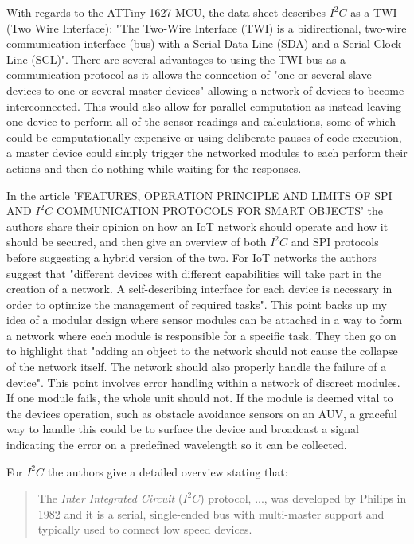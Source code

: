 \documentclass[11pt,a4paper,titlepage]{report}
\begin{document}
	With regards to the ATTiny 1627 MCU, the data sheet describes $I^{2}C$ as a TWI (Two Wire Interface): "The Two-Wire Interface (TWI) is a bidirectional, two-wire communication interface (bus) with a Serial Data Line (SDA) and a Serial Clock Line (SCL)"\cite{ATTINY1627}. There are several advantages to using the TWI bus as a communication protocol as it allows the connection of "one or several slave devices to one or several master devices"\cite{ATTINY1627} allowing a network of devices to become interconnected. This would also allow for parallel computation as instead leaving one device to perform all of the sensor readings and calculations, some of which could be computationally expensive or using deliberate pauses of code execution, a master device could simply trigger the networked modules to each perform their actions and then do nothing while waiting for the responses. 
	
	In the article 'FEATURES, OPERATION PRINCIPLE AND LIMITS OF SPI AND $I^{2}C$ COMMUNICATION PROTOCOLS FOR SMART OBJECTS' the authors share their opinion on how an IoT network should operate and how it should be secured, and then give an overview of both $I^{2}C$ and SPI protocols before suggesting a hybrid version of the two. For IoT networks the authors suggest that "different devices with different capabilities will take part in the creation of a network. A self-describing interface for each device is necessary in order to optimize the management of required tasks"\cite{I2C}. This point backs up my idea of a modular design where sensor modules can be attached in a way to form a network where each module is responsible for a specific task. They then go on to highlight that "adding an object to the network should not cause the collapse of the network itself. The network should also properly handle the failure of a device"\cite{I2C}. This point involves error handling within a network of discreet modules. If one module fails, the whole unit should not. If the module is deemed vital to the devices operation, such as obstacle avoidance sensors on an AUV, a graceful way to handle this could be to surface the device and broadcast a signal indicating the error on a predefined wavelength so it can be collected. 
	
	For $I^{2}C$ the authors give a detailed overview stating that:
	
	\begin{quote}
		The \textit{Inter Integrated Circuit} ($I^{2}C$) protocol, ..., was developed by Philips in 1982 and it is a serial, single-ended bus with multi-master support and typically used to connect low speed devices.\cite{I2C}
	\end{quote}
	
\end{document}
